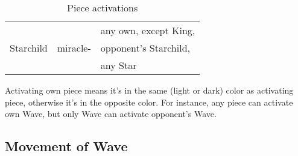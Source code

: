 \begin{table}[!h]
\begin{tabular}{ lll }
\cmidrule{1-3} %
\multirow{3}{*}{Starchild}              & \multirow{3}{*}{miracle-}     & any own, except King,         \\
                                        &                               & opponent's Starchild,         \\
                                        &                               & any Star                      \\
\bottomrule %
\end{tabular}
\caption{Piece activations}
\label{tbl:Appendix/Summary/Piece activations}
\end{table}


Activating own piece means it's in the same (light or dark) color as activating
piece, otherwise it's in the opposite color. For instance, any piece can activate
own Wave, but only Wave can activate opponent's Wave.

\clearpage %

\subsection*{Movement of Wave}
\label{sec:Appendix/Movement of Wave}


